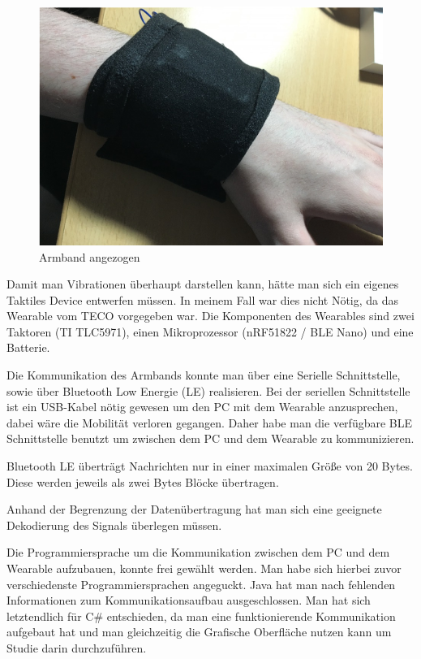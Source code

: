 \begin{figure}
	\centering
    \includegraphics[width=\textwidth]{pics/wristband2.png}
    \caption{Armband angezogen}
    \label{fig:wristband2}
\end{figure}

Damit man Vibrationen {\"u}berhaupt darstellen kann, h{\"a}tte man sich ein eigenes Taktiles Device entwerfen m{\"u}ssen. In meinem Fall war dies nicht N{\"o}tig, da das Wearable vom TECO vorgegeben war. Die Komponenten des Wearables sind zwei Taktoren (TI TLC5971), einen Mikroprozessor (nRF51822 / BLE Nano) und eine Batterie.
 
Die Kommunikation des Armbands konnte man {\"u}ber eine Serielle Schnittstelle, sowie {\"u}ber Bluetooth Low Energie (LE) realisieren.
Bei der seriellen Schnittstelle ist ein USB-Kabel n{\"o}tig gewesen um den PC  mit dem Wearable anzusprechen, dabei w{\"a}re die Mobilit{\"a}t verloren gegangen. Daher habe man die verf{\"u}gbare BLE Schnittstelle benutzt um zwischen dem PC und dem Wearable zu kommunizieren. 

Bluetooth LE {\"u}bertr{\"a}gt Nachrichten nur in einer maximalen Gr{\"o}{\ss}e von 20 Bytes. Diese werden jeweils als zwei Bytes Bl{\"o}cke {\"u}bertragen. 

Anhand der Begrenzung der Daten{\"u}bertragung hat man sich eine geeignete Dekodierung des Signals {\"u}berlegen m{\"u}ssen. 

Die Programmiersprache um die Kommunikation zwischen dem PC und dem Wearable aufzubauen, konnte frei gew{\"a}hlt werden. Man habe sich hierbei zuvor verschiedenste Programmiersprachen angeguckt. Java hat man nach fehlenden Informationen zum Kommunikationsaufbau ausgeschlossen. Man hat sich letztendlich f{\"u}r C\# entschieden, da man eine funktionierende Kommunikation aufgebaut hat und man gleichzeitig die Grafische Oberfl{\"a}che nutzen kann um Studie darin durchzuf{\"u}hren. 

